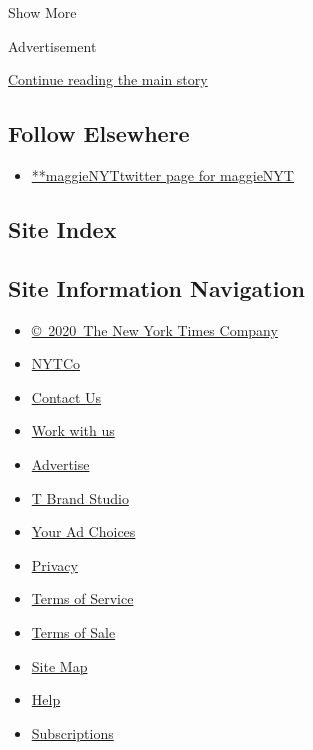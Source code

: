 Show More

Advertisement

\protect\hyperlink{after-mid2}{Continue reading the main story}

\hypertarget{follow-elsewhere}{%
\subsection{Follow Elsewhere}\label{follow-elsewhere}}

\begin{itemize}
\tightlist
\item
  \href{https://twitter.com/maggieNYT}{**maggieNYTtwitter page for
  maggieNYT}
\end{itemize}

\hypertarget{site-index}{%
\subsection{Site Index}\label{site-index}}

\hypertarget{site-information-navigation}{%
\subsection{Site Information
Navigation}\label{site-information-navigation}}

\begin{itemize}
\tightlist
\item
  \href{https://help.nytimes3xbfgragh.onion/hc/en-us/articles/115014792127-Copyright-notice}{©~2020~The
  New York Times Company}
\end{itemize}

\begin{itemize}
\tightlist
\item
  \href{https://www.nytco.com/}{NYTCo}
\item
  \href{https://help.nytimes3xbfgragh.onion/hc/en-us/articles/115015385887-Contact-Us}{Contact
  Us}
\item
  \href{https://www.nytco.com/careers/}{Work with us}
\item
  \href{https://nytmediakit.com/}{Advertise}
\item
  \href{http://www.tbrandstudio.com/}{T Brand Studio}
\item
  \href{https://www.nytimes3xbfgragh.onion/privacy/cookie-policy\#how-do-i-manage-trackers}{Your
  Ad Choices}
\item
  \href{https://www.nytimes3xbfgragh.onion/privacy}{Privacy}
\item
  \href{https://help.nytimes3xbfgragh.onion/hc/en-us/articles/115014893428-Terms-of-service}{Terms
  of Service}
\item
  \href{https://help.nytimes3xbfgragh.onion/hc/en-us/articles/115014893968-Terms-of-sale}{Terms
  of Sale}
\item
  \href{https://spiderbites.nytimes3xbfgragh.onion}{Site Map}
\item
  \href{https://help.nytimes3xbfgragh.onion/hc/en-us}{Help}
\item
  \href{https://www.nytimes3xbfgragh.onion/subscription?campaignId=37WXW}{Subscriptions}
\end{itemize}

